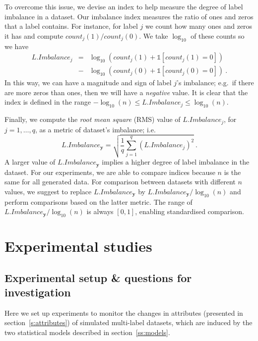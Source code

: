 \documentclass[review]{elsarticle}
\begin{document}
	To overcome this issue, we devise an index to help measure the degree of label imbalance in a dataset. Our imbalance index measures the ratio of ones and zeros that a label contains. For instance, for label $j$ we count how many ones and zeros it has and compute $count_{j}(1)/count_{j}(0)$. We take $\log_{10}$ of these counts so we have
	\begin{eqnarray} \nonumber
	L.Imbalance_{j} &=& \log_{10}(count_{j}(1) + \mathds{1}[count_{j}(1) = 0]) \\  &-& \log_{10}(count_{j}(0) + \mathds{1}[count_{j}(0) = 0])\ .
	\end{eqnarray}
	In this way, we can have a magnitude and sign of label $j$'s imbalance; e.g.~if there are more zeros than ones, then we will have a \emph{negative} value. It is clear that the index is defined in the range $-\log_{10}(n) \leq L.Imbalance_{j} \leq \log_{10}(n)$. 
	
	Finally, we compute the \emph{root mean square} (RMS) value of $L.Imbalance_{j}$, for $j=1,\ldots,q$, as a metric of dataset's imbalance; i.e.
	\begin{equation}\label{LIMB}
	L.Imbalance_{\mathbf{y}} = \sqrt{\frac{1}{q} \sum^{q}_{j=1}{\left( L.Imbalance_{j} \right)^{2} }}\ .
	\end{equation}
	A larger value of $L.Imbalance_{\mathbf{y}}$ implies a higher degree of label imbalance in the dataset. For our experiments, we are able to compare indices because $n$ is the same for all generated data. For comparison between datasets with different $n$ values, we suggest to replace $L.Imbalance_{\mathbf{y}}$ by $L.Imbalance_{\mathbf{y}}/\log_{10}(n)$ and perform comparisons based on the latter metric. The range of $L.Imbalance_{\mathbf{y}}/\log_{10}(n)$ is always $[0,1]$, enabling standardised comparison.
	
	
	\section{Experimental studies}
	
	\subsection{Experimental setup \& questions for investigation}
	\label{DEXPER} 
	
	Here we set up experiments to monitor the changes in attributes (presented in section~\ref{s:attributes}) of simulated multi-label datasets, which are induced by the two statistical models described in section~\ref{ss:models}.
	
\end{document}
